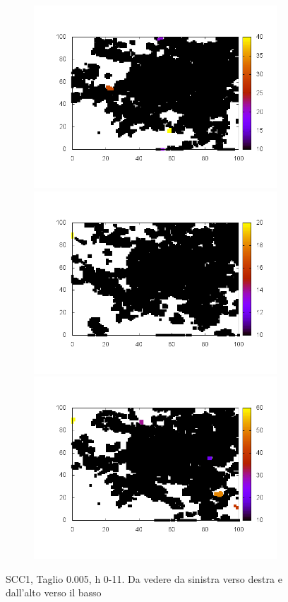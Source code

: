 \documentclass[10pt,a4paper]{article}
\begin{document}
\begin{figure}
\begin{subfigure}[b]{1\textwidth}
\end{subfigure}
\begin{subfigure}[b]{1\textwidth}
\includegraphics[scale=.3]{./img/stampe/scc1/9.png}
\includegraphics[scale=.3]{./img/stampe/scc1/10.png}
\includegraphics[scale=.3]{./img/stampe/scc1/11.png}
\end{subfigure}
\caption{SCC1, Taglio 0.005, h 0-11. Da vedere da sinistra verso destra e dall'alto verso il basso}
\end{figure}
\end{document}
